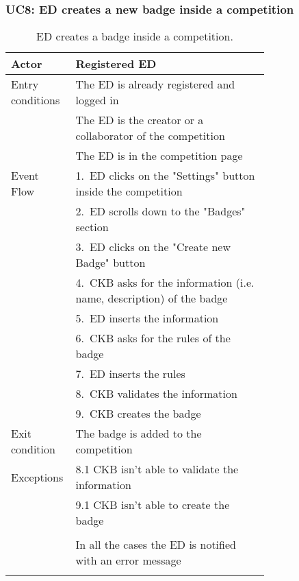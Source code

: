 \subsubsection*{UC8: ED creates a new badge inside a competition}
\begin{center}
  \begin{longtable}{l|p{0.75\linewidth}}
    \hline
    Actor & Registered ED \\
    \hline
    Entry conditions & The ED is already registered and logged in  \\
    & The ED is the creator or a collaborator of the competition \\
    & The ED is in the competition page \\
    \hline
    Event Flow & 1.\ ED clicks on the "Settings" button inside the competition\\
    & 2.\ ED scrolls down to the "Badges" section \\
    & 3.\ ED clicks on the "Create new Badge" button \\
    & 4.\ CKB asks for the information (i.e. name, description) of the badge \\
    & 5.\ ED inserts the information \\
    & 6.\ CKB asks for the rules of the badge \\
    & 7.\ ED inserts the rules \\
    & 8.\ CKB validates the information \\
    & 9.\ CKB creates the badge \\
    \hline
    Exit condition &  The badge is added to the competition \\
    \hline
    Exceptions & 8.1 CKB isn’t able to validate the information \\
    & 9.1 CKB isn’t able to create the badge \\ \\
    & In all the cases the ED is notified with an error message \\
    \hline
    \caption{ED creates a badge inside a competition.}
    \label{tab: ED_create_badge}
  \end{longtable}
\end{center}

